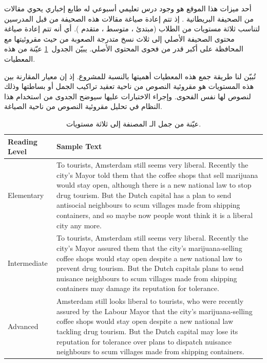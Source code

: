 أحد ميزات هذا الموقع هو وجود درس تعليمي أسبوعي له طابع إخباري يحوي مقالات من الصحيفة البريطانية .
إذ تتم إعادة صياغة مقالات هذه الصحيفة من قبل المدرسين لتناسب ثلاثة مستويات من الطلاب
(مبتدئ ، متوسط ، متقدم ).
أي أنه تتم إعادة صياغة محتوى الصحيفة الأصلي إلى ثلاث نسخ متدرجة الصعوبة من حيث مقروئيتها مع المحافظة على أكبر قدر من فحوى المحتوى الأصلي.
يبيّن الجدول~\ref{tbl:corpus:ose} عيّنة من هذه المعطيات.

تُبيّن لنا طريقة جمع هذه المعطيات أهميتها بالنسبة للمشروع.
إذ إن معيار المقارنة بين هذه المستويات هو مقروئية النصوص من ناحية تعقيد تراكيب الجمل أو بساطتها وذلك لنصوص لها نفس الفحوى.
وإجراء الاختبارات عليها سيوضح الجدوى من استخدام هذا النظام في تحليل مقروئية النصوص من ناحية الصياغة.

\begin{table}[htb]
	\centering
	{
		\setlength{\tabcolsep}{0.5em} %
		\renewcommand{\arraystretch}{1.4}%
		
		\begin{tabular}{|>{\arraybackslash}p{}|>{\arraybackslash}p{}|}
			\hline
			\textbf{Reading Level} &
			\textbf{Sample Text} \\
			\hline 
			Elementary &
			To tourists, Amsterdam still seems very liberal. Recently the city’s Mayor told
			them that the coffee shops that sell marijuana would stay open, although there
			is a new national law to stop drug tourism. But the Dutch capital has a plan
			to send antisocial neighbours to scum villages made from shipping containers,
			and so maybe now people wont think it is a liberal city any more. \\
			\hline 
			Intermediate &
			To tourists, Amsterdam still seems very liberal. Recently the city’s Mayor assured them that the city’s marijuana-selling coffee shops would stay open despite a new national law to prevent drug tourism. But the Dutch capitals plans
			to send nuisance neighbours to scum villages made from shipping containers
			may damage its reputation for tolerance. \\
			\hline 
			Advanced &
			Amsterdam still looks liberal to tourists, who were recently assured by the
			Labour Mayor that the city’s marijuana-selling coffee shops would stay open
			despite a new national law tackling drug tourism. But the Dutch capital may
			lose its reputation for tolerance over plans to dispatch nuisance neighbours to
			scum villages made from shipping containers. \\
			\hline 
		\end{tabular}
	}
	\caption{%
		عيّنة من جمل الـ  المصنفة إلى ثلاثة مستويات.
	}
	\label{tbl:corpus:ose}
\end{table}

